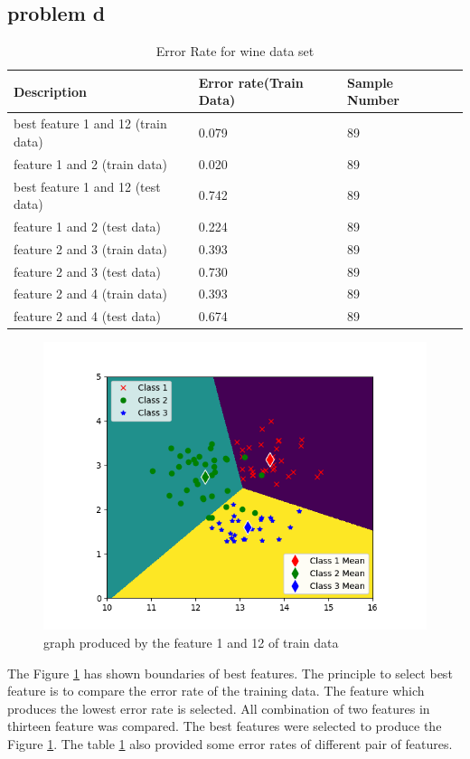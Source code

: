\documentclass{article}
\begin{document}
	\subsection{problem d}
		\begin{table}[hbt!]
		\begin{center}
			\begin{tabular}{| l | l | l  | p{5cm} |}
				\hline
				Description     & Error rate(Train Data) & Sample Number    \\ \hline
best feature 1 and 12 (train data)     &0.079    &    89    \\      \hline
feature 1 and 2 (train data)  & 0.020	  &	   89     \\      \hline
best feature 1 and 12 (test data)	   & 0.742     &    89       \\      \hline
feature 1 and 2 (test data)      & 0.224	  &	   89      \\      \hline
feature 2 and 3 (train data)	   & 0.393    &    89       \\      \hline
feature 2 and 3 (test data)      & 0.730	  &	   89      \\      \hline
feature 2 and 4 (train data)	   & 0.393    &    89       \\      \hline
feature 2 and 4 (test data)      & 0.674	  &	   89      \\      \hline
			\end{tabular}
		\end{center}
		\caption{Error Rate for wine data set}
		\label{table: wineerrorrate}
	\end{table}
	\begin{figure}[hbt!]
		\includegraphics[width=\linewidth]{images/best_features_wine.png}	
		\caption{graph produced by the feature 1 and 12 of train data}
		\label{fig: bestFeature}
	\end{figure} 
	The Figure \ref{fig: bestFeature} has shown boundaries of best features. The principle to select best feature is to compare the error rate of the training data. The feature which produces the lowest error rate is selected. All combination of two features in thirteen feature was compared. The best features were selected to produce the Figure \ref{fig: bestFeature}. The table \ref{table: wineerrorrate} also provided some error rates of different pair of features. 
\end{document}

